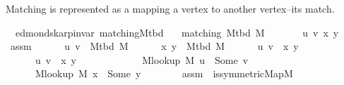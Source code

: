 \begin{isabellebody}
\begin{isamarkuptext}
Matching  is represented as a  mapping a vertex to another
vertex--its match.%
\end{isamarkuptext}\isamarkuptrue%
\isamarkupfalse%
\ {\isacharparenleft}{\kern0pt}\ edmonds{\isacharunderscore}{\kern0pt}karp{\isacharunderscore}{\kern0pt}invar{\isacharparenright}{\kern0pt}\ matching{\isacharunderscore}{\kern0pt}M{\isacharunderscore}{\kern0pt}tbd{\isacharcolon}{\kern0pt}\isanewline
\ \ \ {\isachardoublequoteopen}matching\ {\isacharparenleft}{\kern0pt}M{\isacharunderscore}{\kern0pt}tbd\ M{\isacharparenright}{\kern0pt}{\isachardoublequoteclose}\isanewline
%
\isadelimproof
%
\endisadelimproof
%
\isatagproof
{}\isamarkupfalse%
\ {\isacharminus}{\kern0pt}\isanewline
\ \ \isacommand{{\isacharbraceleft}{\kern0pt}}\isamarkupfalse%
\ \isamarkupfalse%
\ u\ v\ x\ y\isanewline
\ \ \ \ \isamarkupfalse%
\ assm{\isacharcolon}{\kern0pt}\isanewline
\ \ \ \ \ \ {\isachardoublequoteopen}{\isacharbraceleft}{\kern0pt}u{\isacharcomma}{\kern0pt}\ v{\isacharbraceright}{\kern0pt}\ {\isasymin}\ M{\isacharunderscore}{\kern0pt}tbd\ M{\isachardoublequoteclose}\isanewline
\ \ \ \ \ \ {\isachardoublequoteopen}{\isacharbraceleft}{\kern0pt}x{\isacharcomma}{\kern0pt}\ y{\isacharbraceright}{\kern0pt}\ {\isasymin}\ M{\isacharunderscore}{\kern0pt}tbd\ M{\isachardoublequoteclose}\isanewline
\ \ \ \ \ \ {\isachardoublequoteopen}{\isacharbraceleft}{\kern0pt}u{\isacharcomma}{\kern0pt}\ v{\isacharbraceright}{\kern0pt}\ {\isasymnoteq}\ {\isacharbraceleft}{\kern0pt}x{\isacharcomma}{\kern0pt}\ y{\isacharbraceright}{\kern0pt}{\isachardoublequoteclose}\isanewline
\ \ \ \ \ \ {\isachardoublequoteopen}{\isacharbraceleft}{\kern0pt}u{\isacharcomma}{\kern0pt}\ v{\isacharbraceright}{\kern0pt}\ {\isasyminter}\ {\isacharbraceleft}{\kern0pt}x{\isacharcomma}{\kern0pt}\ y{\isacharbraceright}{\kern0pt}\ {\isasymnoteq}\ {\isacharbraceleft}{\kern0pt}{\isacharbraceright}{\kern0pt}{\isachardoublequoteclose}\isanewline
\ \ \ \ \isamarkupfalse%
\isanewline
\ \ \ \ \ \ {\isachardoublequoteopen}M{\isacharunderscore}{\kern0pt}lookup\ M\ u\ {\isacharequal}{\kern0pt}\ Some\ v{\isachardoublequoteclose}\isanewline
\ \ \ \ \ \ {\isachardoublequoteopen}M{\isacharunderscore}{\kern0pt}lookup\ M\ x\ {\isacharequal}{\kern0pt}\ Some\ y{\isachardoublequoteclose}\isanewline
\ \ \ \ \ \ \isamarkupfalse%
\ assm{\isacharparenleft}{\kern0pt}{}{\isacharcomma}{\kern0pt}\ {}{\isacharparenright}{\kern0pt}\ is{\isacharunderscore}{\kern0pt}symmetric{\isacharunderscore}{\kern0pt}Map{\isacharunderscore}{\kern0pt}M\isanewline

\end{isabellebody}
